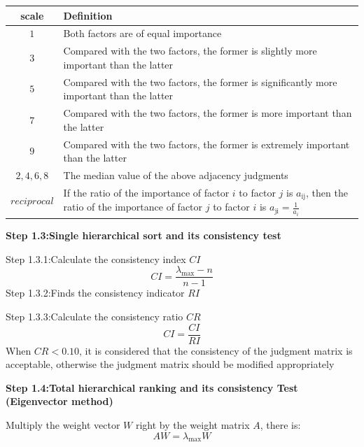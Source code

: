 \documentclass[12pt]{article}
\begin{document}
\begin{table}[!htbp]
	\centering
	\small
	\begin{tabular}{cp{10cm}}
			\toprule
			scale & Definition \\
			\midrule
			${1}$ & Both factors are of equal importance\\
			${3}$ & Compared with the two factors, the former is slightly more important than the latter\\
			${5}$ & Compared with the two factors, the former is significantly more important than the latter\\
			${7}$ & Compared with the two factors, the former is more important than the latter\\
			${9}$ & Compared with the two factors, the former is extremely important than the latter \\
			${2,4,6,8}$ &The median value of the above adjacency judgments \\
			${reciprocal}$ &If the ratio of the importance of factor $i$ to factor $j$ is $a_{\text{ij}}$, then the ratio of the importance of factor $j$ to factor $i$ is $a_{\text{ji}}=\frac{1}{a_{i}}$ \\
			\bottomrule
	\end{tabular}
\end{table}

\textbf{Step 1.3:Single hierarchical sort and its consistency test}

Step 1.3.1:Calculate the consistency index $CI$
\begin{equation}
   CI=\frac{{\lambda_{\text{max}} - n}}{{n-1}}
\end{equation}
Step 1.3.2:Finds the consistency indicator $RI$


Step 1.3.3:Calculate the consistency ratio $CR$
\begin{equation}
	CI=\frac{CI}{RI}
 \end{equation}
 When $CR<0.10$, it is considered that the consistency of the judgment matrix is acceptable, otherwise the judgment matrix should be modified appropriately
 
 \textbf{Step 1.4:Total hierarchical ranking and its consistency Test (Eigenvector method)}

 Multiply the weight vector $W$ right by the weight matrix $A$, there is:
 \begin{equation}
	AW=\lambda_{\text{max}}W
 \end{equation}

\end{document}
